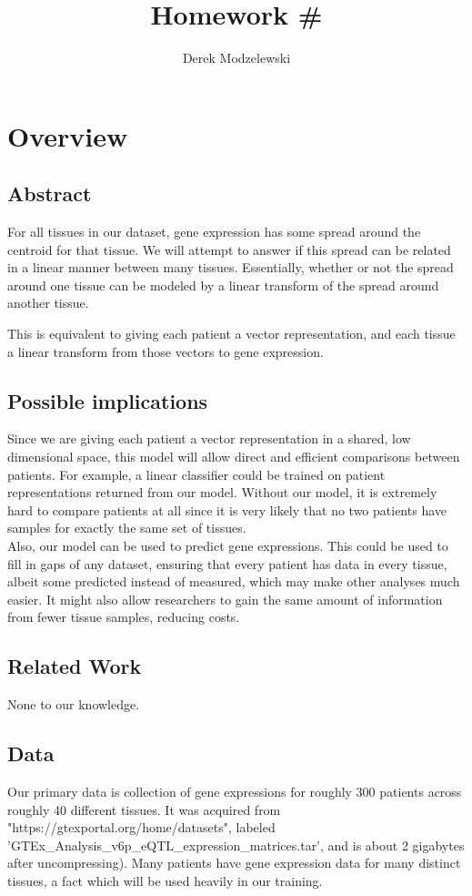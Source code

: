 \documentclass{article}
\title{Homework \# }
\author{Derek Modzelewski}
\newcommand{\hs}[1]{\hspace*{#1 cm}}
\begin{document}
\maketitle

\section{Overview}

\subsection{Abstract} %
\hs{.5}
For all tissues in our dataset, gene expression has some spread around the centroid for that tissue. We will attempt to answer if this spread can be related in a linear manner between many tissues. Essentially, whether or not the spread around one tissue can be modeled by a linear transform of the spread around another tissue.

This is equivalent to giving each patient a vector representation, and each tissue a linear transform from those vectors to gene expression.

\subsection{Possible implications}
\hs{.5}
Since we are giving each patient a vector representation in a shared, low dimensional space, this model will allow direct and efficient comparisons between patients. For example, a linear classifier could be trained on patient representations returned from our model. Without our model, it is extremely hard to compare patients at all since it is very likely that no two patients have samples for exactly the same set of tissues.  \\

Also, our model can be used to predict gene expressions. This could be used to fill in gaps of any dataset, ensuring that every patient has data in every tissue, albeit some predicted instead of measured, which may make other analyses much easier. It might also allow researchers to gain the same amount of information from fewer tissue samples, reducing costs. \\

\subsection{Related Work}
None to our knowledge.

\subsection{Data} %
\hs{.5}
Our primary data is collection of gene expressions for roughly 300 patients across roughly 40 different tissues. %
It was acquired from "https://gtexportal.org/home/datasets", labeled 'GTEx\_Analysis\_v6p\_eQTL\_expression\_matrices.tar', and is about 2 gigabytes after uncompressing). Many patients have gene expression data for many distinct tissues, a fact which will be used heavily in our training. \\
\end{document}
